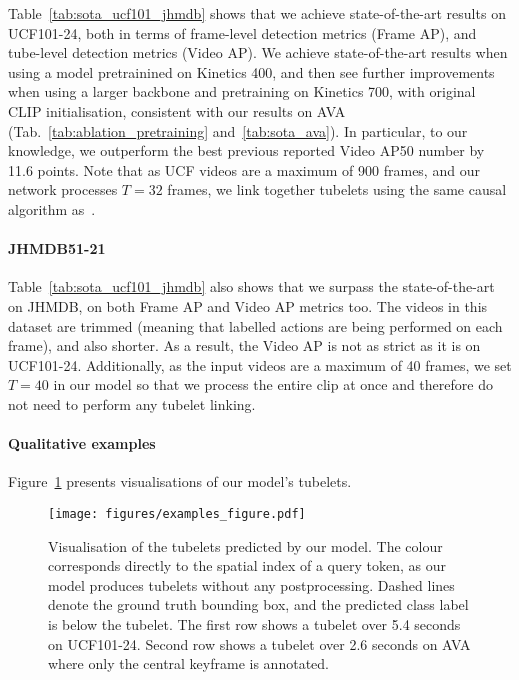\documentclass[10pt,twocolumn,letterpaper]{article}
\def \paravspace {-0.7\baselineskip}
\begin{document}
Table~\ref{tab:sota_ucf101_jhmdb} shows that we achieve state-of-the-art results on UCF101-24, both in terms of frame-level detection metrics (Frame AP), and tube-level detection metrics (Video AP).
We achieve state-of-the-art results when using a model pretrainined on Kinetics 400, and then see further improvements when using a larger backbone and pretraining on Kinetics 700, with original CLIP initialisation, consistent with our results on AVA (Tab.~\ref{tab:ablation_pretraining} and~\ref{tab:sota_ava}).
In particular, to our knowledge, we outperform the best previous reported Video AP50 number by 11.6 points.
Note that as UCF videos are a maximum of 900 frames, and our network processes $T = 32$ frames, we link together tubelets using the same causal algorithm as~\cite{kalogeiton_iccv_2017, li2020actions}.

\vspace{\paravspace}
\paragraph{JHMDB51-21}

Table~\ref{tab:sota_ucf101_jhmdb} also shows that we surpass the state-of-the-art on JHMDB, on both Frame AP and Video AP metrics too.
The videos in this dataset are trimmed (meaning that labelled actions are being performed on each frame), and also shorter.
As a result, the Video AP is not as strict as it is on UCF101-24.
Additionally, as the input videos are a maximum of 40 frames, we set $T = 40$ in our model so that we process the entire clip at once and therefore do not need to perform any tubelet linking.

\vspace{\paravspace}
\paragraph{Qualitative examples}
Figure~\ref{fig:examples} presents visualisations of our model's tubelets.

\begin{figure}[t]
	\vspace{0\baselineskip}
	\texttt{[image: figures/examples\_figure.pdf]}
	\vspace{-1\baselineskip}
	\caption{
        Visualisation of the tubelets predicted by our model.
        The colour corresponds directly to the spatial index of a query token, as our model produces tubelets without any postprocessing.
        Dashed lines denote the ground truth bounding box, and the predicted class label is below the tubelet.
        The first row shows a tubelet over 5.4 seconds on UCF101-24.
        Second row shows a tubelet over 2.6 seconds on AVA where only the central keyframe is annotated.
	}
	\label{fig:examples}
\end{figure} 
\end{document}
